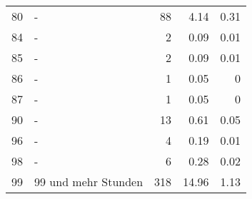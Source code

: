 \begin{longtable}{lXrrr}
        80 & \multicolumn{1}{X}{-} & %
          \num{88} &
          \num[round-mode=places,round-precision=2]{4.14} &
          \num[round-mode=places,round-precision=2]{0.31} \\

        84 & \multicolumn{1}{X}{-} & %
          \num{2} &
          \num[round-mode=places,round-precision=2]{0.09} &
          \num[round-mode=places,round-precision=2]{0.01} \\

        85 & \multicolumn{1}{X}{-} & %
          \num{2} &
          \num[round-mode=places,round-precision=2]{0.09} &
          \num[round-mode=places,round-precision=2]{0.01} \\

        86 & \multicolumn{1}{X}{-} & %
          \num{1} &
          \num[round-mode=places,round-precision=2]{0.05} &
          \num[round-mode=places,round-precision=2]{0} \\

        87 & \multicolumn{1}{X}{-} & %
          \num{1} &
          \num[round-mode=places,round-precision=2]{0.05} &
          \num[round-mode=places,round-precision=2]{0} \\

        90 & \multicolumn{1}{X}{-} & %
          \num{13} &
          \num[round-mode=places,round-precision=2]{0.61} &
          \num[round-mode=places,round-precision=2]{0.05} \\

        96 & \multicolumn{1}{X}{-} & %
          \num{4} &
          \num[round-mode=places,round-precision=2]{0.19} &
          \num[round-mode=places,round-precision=2]{0.01} \\

        98 & \multicolumn{1}{X}{-} & %
          \num{6} &
          \num[round-mode=places,round-precision=2]{0.28} &
          \num[round-mode=places,round-precision=2]{0.02} \\

        99 & \multicolumn{1}{X}{99 und mehr Stunden} & %
          \num{318} &
          \num[round-mode=places,round-precision=2]{14.96} &
          \num[round-mode=places,round-precision=2]{1.13} \\


\end{longtable}
